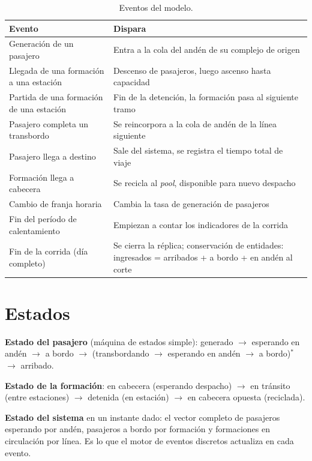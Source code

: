 \documentclass{article}
\begin{document}
\begin{table}[H]
\centering
\small
\begin{tabular}{@{}L{5.5cm}L{8cm}@{}}
\toprule
Evento & Dispara \\
\midrule
Generación de un pasajero & Entra a la cola del andén de su complejo de origen \\
Llegada de una formación a una estación & Descenso de pasajeros, luego ascenso hasta
  capacidad \\
Partida de una formación de una estación & Fin de la detención, la formación pasa
  al siguiente tramo \\
Pasajero completa un transbordo & Se reincorpora a la cola de andén de la línea
  siguiente \\
Pasajero llega a destino & Sale del sistema, se registra el tiempo total de viaje \\
Formación llega a cabecera & Se recicla al \textit{pool}, disponible para nuevo
  despacho \\
Cambio de franja horaria & Cambia la tasa de generación de pasajeros \\
Fin del período de calentamiento & Empiezan a contar los indicadores de la corrida \\
Fin de la corrida (día completo) & Se cierra la réplica; conservación de entidades:
  ingresados = arribados + a bordo + en andén al corte \\
\bottomrule
\end{tabular}
\caption{Eventos del modelo.}
\end{table}

\section{Estados}

\textbf{Estado del pasajero} (máquina de estados simple): generado
$\rightarrow$ esperando en andén $\rightarrow$ a bordo $\rightarrow$
(transbordando $\rightarrow$ esperando en andén $\rightarrow$ a bordo)$^{*}$
$\rightarrow$ arribado.

\textbf{Estado de la formación}: en cabecera (esperando despacho) $\rightarrow$ en
tránsito (entre estaciones) $\rightarrow$ detenida (en estación) $\rightarrow$ en
cabecera opuesta (reciclada).

\textbf{Estado del sistema} en un instante dado: el vector completo de pasajeros
esperando por andén, pasajeros a bordo por formación y formaciones en circulación
por línea. Es lo que el motor de eventos discretos actualiza en cada evento.
\end{document}
